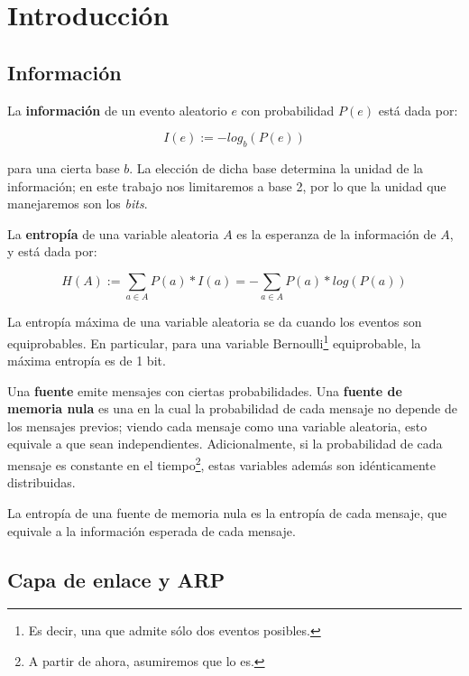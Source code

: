 \section{Introducci\'on}

\subsection{Información}

\par La \textbf{información} de un evento aleatorio $e$ con probabilidad $P(e)$ está dada por:

\begin{equation*}
    I(e) := -log_b(P(e))
\end{equation*}

para una cierta base $b$. 
La elección de dicha base determina la unidad de la información; en este trabajo nos limitaremos a base 2, por lo que la unidad que manejaremos son los \textit{bits}. 

\par La \textbf{entropía} de una variable aleatoria $A$ es la esperanza de la información de $A$, y está dada por:

\begin{equation*}
    H(A) := \sum_{a \in A}{P(a) * I(a)} = - \sum_{a \in A}{P(a) * log(P(a))}
\end{equation*}

\par La entropía máxima de una variable aleatoria se da cuando los eventos son equiprobables.
En particular, para una variable Bernoulli\footnote{Es decir, una que admite sólo dos eventos posibles.} equiprobable, la máxima entropía es de 1 bit.

\par Una \textbf{fuente} emite mensajes con ciertas probabilidades.
Una \textbf{fuente de memoria nula} es una en la cual la probabilidad de cada mensaje no depende de los mensajes previos; viendo cada mensaje como una variable aleatoria, esto equivale a que sean independientes.
Adicionalmente, si la probabilidad de cada mensaje es constante en el tiempo\footnote{A partir de ahora, asumiremos que lo es.}, estas variables además son idénticamente distribuidas.

\par La entropía de una fuente de memoria nula es la entropía de cada mensaje, que equivale a la información esperada de cada mensaje.

\subsection{Capa de enlace y ARP}

